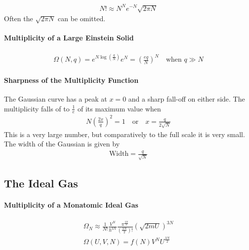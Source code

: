 \documentclass[12pt]{article}
\begin{document}
\begin{align}
  N!\approx N^Ne^{-N}\sqrt{2\pi N}
\end{align}
Often the $\sqrt{2\pi N}$ can be omitted.

\paragraph{Multiplicity of a Large Einstein Solid}%
\label{par:multiplicity_of_a_large_einstein_solid}

\begin{align}
  \Omega(N,q)=e^{N\log\left(\frac{q}{N}\right)}e^N=\left(\frac{eq}{N}\right)^N\quad\text{when
  $q\gg N$}
\end{align}

\paragraph{Sharpness of the Multiplicity Function}%
\label{par:sharpness_of_the_multiplicity_function}

The Gaussian curve has a peak at $x=0$ and a sharp fall-off on either side. The
multiplicity falls of to $\frac{1}{e}$ of its maximum value when
\begin{align}
  N\left(\frac{2x}{q}\right)^2=1\quad\text{or}\quad x=\frac{q}{2\sqrt{N}}
\end{align}
This is a very large number, but comparatively to the full scale it is very
small. The width of the Gaussian is given by
\begin{align}
  \text{Width} = \frac{q}{\sqrt{N}}
\end{align}

\subsection{The Ideal Gas}%
\label{sub:the_ideal_gas}

\paragraph{Multiplicity of a Monatomic Ideal Gas}%
\label{par:multiplicity_of_a_monatomic_ideal_gas}

\begin{align}
  \Omega_N\approx
  \frac{1}{N!}\frac{V^N}{h^{3N}}\frac{\pi^{\frac{3N}{2}}}{\left(\frac{3N}{2}\right)!}\left(\sqrt{2mU}\right)^{3N}\\
  \Omega(U,V,N)=f(N)V^NU^{\frac{3N}{2}}
\end{align}
\end{document}
